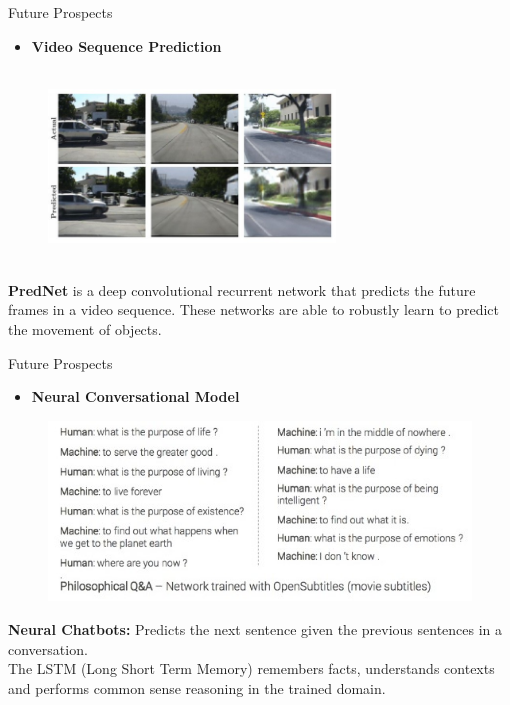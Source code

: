 \documentclass[10pt]{beamer}
\begin{document}
	\begin{frame}[c]{Future Prospects}
		\begin{itemize}
			\item \large{\textbf{Video Sequence Prediction}}
		\end{itemize}
		\begin{figure}
			\includegraphics[width=3in, height=2in]{images/vsp}
		\end{figure}
		\textbf{PredNet} is a deep convolutional recurrent network that \alert{predicts the future frames in a video sequence}. These networks are able to robustly learn to predict the movement of objects.
	\end{frame}
	\begin{frame}[c]{Future Prospects}
		\begin{itemize}
			\item \large{\textbf{Neural Conversational Model}}
		\end{itemize}
		\begin{figure}
			\includegraphics[width=\linewidth]{images/ncm}
		\end{figure}
		\textbf{Neural Chatbots:} \alert{Predicts the next sentence} given the previous sentences in a conversation.\\
		The LSTM (Long Short Term Memory) remembers facts, understands contexts and performs common sense reasoning in the trained domain.
	\end{frame}
\end{document}

